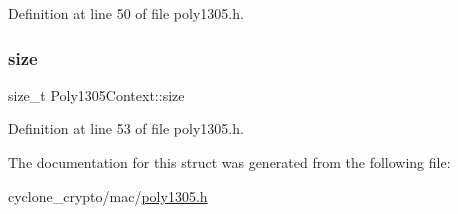 Definition at line 50 of file poly1305.\+h.

\mbox{\label{structPoly1305Context_a5e026316dee7aa495f38d3db5331ab20}} 
\subsubsection{\texorpdfstring{size}{size}}
{\footnotesize\ttfamily size\+\_\+t Poly1305\+Context\+::size}



Definition at line 53 of file poly1305.\+h.



The documentation for this struct was generated from the following file\+:\begin{DoxyCompactItemize}
\item 
cyclone\+\_\+crypto/mac/\hyperlink{poly1305_8h}{poly1305.\+h}\end{DoxyCompactItemize}
